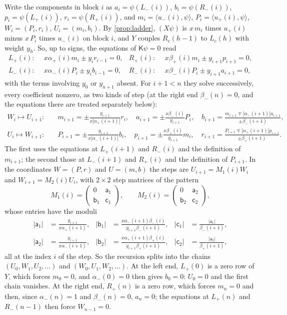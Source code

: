 Write the components in block $i$ as $a_i=\psi(L_-(i))$, $b_i=\psi(R_-(i))$, $p_i=\psi(L_+(i))$,
$r_i=\psi(R_+(i))$, and $m_i=\langle u_-(i),\psi\rangle$, $P_i=\langle u_+(i),\psi\rangle$,
$W_i=(P_i,r_i)$, $U_i=(m_i,b_i)$. By \cref{prop:ladder}, $(X\psi)$ is $x\,m_i$ times $u_+(i)$
minus $x\,P_i$ times $u_-(i)$ on block $i$, and $Y$ couples $R_c(h-1)$ to $L_c(h)$ with
weight $y_h$. So, up to signs, the equations of $\mathsf K\psi=0$ read
\begin{align*}
  L_+(i):&\ \ x\alpha_+(i)m_i\pm y_ir_{i-1}=0, & R_+(i):&\ \ x\beta_+(i)m_i\pm y_{i+1}p_{i+1}=0,\\
  L_-(i):&\ \ x\alpha_-(i)P_i\pm y_ib_{i-1}=0, & R_-(i):&\ \ x\beta_-(i)P_i\pm y_{i+1}a_{i+1}=0,
\end{align*}
with the terms involving $y_0$ or $y_{n+1}$ absent. For $i+1<n$ they solve successively,
every coefficient nonzero, as two kinds of step (at the right end $\beta_-(n)=0$, and the
equations there are treated separately below):
\begin{align*}
  W_i\mapsto U_{i+1}:&\quad m_{i+1}=\pm\tfrac{y_{i+1}}{x|\alpha_+(i+1)|}r_i,\quad a_{i+1}=\pm\tfrac{x\beta_-(i)}{y_{i+1}}P_i,\quad
    b_{i+1}=\tfrac{m_{i+1}\mp|\alpha_-(i+1)|a_{i+1}}{\pm\beta_-(i+1)},\\
  U_i\mapsto W_{i+1}:&\quad P_{i+1}=\pm\tfrac{y_{i+1}}{x|\alpha_-(i+1)|}b_i,\quad p_{i+1}=\pm\tfrac{x\beta_+(i)}{y_{i+1}}m_i,\quad
    r_{i+1}=\tfrac{P_{i+1}\mp|\alpha_+(i+1)|p_{i+1}}{\pm\beta_+(i+1)}.
\end{align*}
The first uses the equations at $L_+(i+1)$ and $R_-(i)$ and the definition of $m_{i+1}$;
the second those at $L_-(i+1)$ and $R_+(i)$ and the definition of $P_{i+1}$. In the
coordinates $W=(P,r)$ and $U=(m,b)$ the steps are $U_{i+1}=M_1(i)W_i$ and
$W_{i+1}=M_2(i)U_i$, with $2\times2$ step matrices of the pattern
\[
  M_1(i)=\begin{pmatrix}0&\mathsf a_1\\\mathsf b_1&\mathsf c_1\end{pmatrix},\qquad
  M_2(i)=\begin{pmatrix}0&\mathsf a_2\\\mathsf b_2&\mathsf c_2\end{pmatrix},
\]
whose entries have the moduli
\begin{align*}
  |\mathsf a_1|&=\frac{y_{i+1}}{x\alpha_+(i+1)},& |\mathsf b_1|&=\frac{x\alpha_-(i+1)\beta_-(i)}{y_{i+1}\beta_-(i+1)},& |\mathsf c_1|&=\frac{|\mathsf a_1|}{\beta_-(i+1)},\\
  |\mathsf a_2|&=\frac{y_{i+1}}{x\alpha_-(i+1)},& |\mathsf b_2|&=\frac{x\alpha_+(i+1)\beta_+(i)}{y_{i+1}\beta_+(i+1)},& |\mathsf c_2|&=\frac{|\mathsf a_2|}{\beta_+(i+1)},
\end{align*}
all at the index $i$ of the step. So the recursion splits into the chains
$(U_0,W_1,U_2,\dots)$ and $(W_0,U_1,W_2,\dots)$. At the left end, $L_+(0)$ is a zero row
of $Y$, which forces $m_0=0$, and $\alpha_-(0)=0$ then gives $b_0=0$: $U_0=0$ and the first
chain vanishes. At the right end, $R_+(n)$ is a zero row, which forces $m_n=0$ and then,
since $\alpha_-(n)=1$ and $\beta_-(n)=0$, $a_n=0$; the equations at $L_+(n)$ and $R_-(n-1)$
then force $W_{n-1}=0$.

